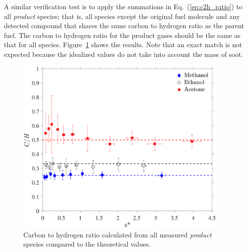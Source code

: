 \documentclass[12pt]{article}
\begin{document}
A similar verification test is to apply the summations in Eq.~(\ref{eq:c2h_ratio}) to all {\em product} species; that is, all species except the original fuel molecule and any detected compound that shares the same carbon to hydrogen ratio as the parent fuel. The carbon to hydrogen ratio for the product gases should be the same as that for all species. Figure~\ref{fig:SCR} shows the results. Note that an exact match is not expected because the idealized values do not take into account the mass of soot.
\begin{figure}[h!]
	\centering
\includegraphics[width=10.5cm, keepaspectratio]{Prod_ratio_Comparison.pdf}
	\caption[Carbon to hydrogen ratio calculated from all {\em product} species]{Carbon to hydrogen ratio calculated from all measured {\em product} species compared to the theoretical values.}
	\label{fig:SCR}
\end{figure}
\end{document}
